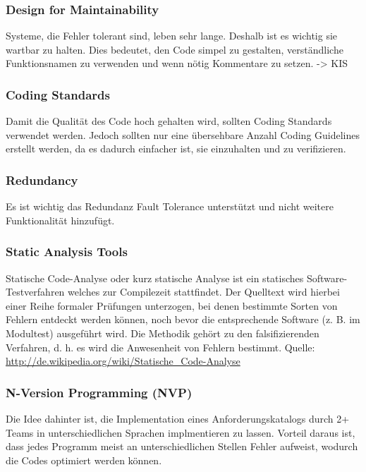 \subsubsection*{Design for Maintainability}

Systeme, die Fehler tolerant sind, leben sehr lange. Deshalb ist es wichtig sie wartbar zu halten. Dies bedeutet, den Code simpel zu gestalten, verständliche Funktionsnamen zu verwenden und wenn nötig Kommentare zu setzen. -> KIS

\subsubsection*{Coding Standards}

Damit die Qualität des Code hoch gehalten wird, sollten Coding Standards verwendet werden. Jedoch sollten nur eine übersehbare Anzahl Coding Guidelines erstellt werden, da es dadurch einfacher ist, sie einzuhalten und zu verifizieren.

\subsubsection*{Redundancy}

Es ist wichtig das Redundanz Fault Tolerance unterstützt und nicht weitere Funktionalität hinzufügt.

\subsubsection*{Static Analysis Tools}

Statische Code-Analyse oder kurz statische Analyse ist ein statisches Software-Testverfahren welches zur Compilezeit stattfindet. Der Quelltext wird hierbei einer Reihe formaler Prüfungen unterzogen, bei denen bestimmte Sorten von Fehlern entdeckt werden können, noch bevor die entsprechende Software (z. B. im Modultest) ausgeführt wird. Die Methodik gehört zu den falsifizierenden Verfahren, d. h. es wird die Anwesenheit von Fehlern bestimmt. Quelle: \url{http://de.wikipedia.org/wiki/Statische_Code-Analyse}

\subsubsection*{N-Version Programming (NVP)}

Die Idee dahinter ist, die Implementation eines Anforderungskatalogs durch 2+ Teams in unterschiedlichen Sprachen implmentieren zu lassen. Vorteil daraus ist, dass jedes Programm meist an unterschiedlichen Stellen Fehler aufweist, wodurch die Codes optimiert werden können.

